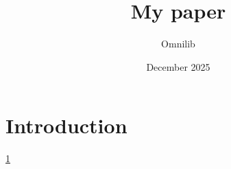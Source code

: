 \documentclass{article}
\title{My paper}
\author{Omnilib}
\date{December 2025}
\begin{document}
\maketitle

\section{Introduction}
\label{aaa}

\ref{aaa}
\end{document}
